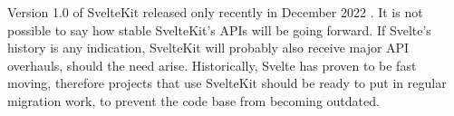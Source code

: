 Version 1.0 of SvelteKit released only recently in December 2022 \cite{team_announcing_2022}. It is not possible to say how stable SvelteKit's APIs will be going forward. If Svelte's history is any indication, SvelteKit will probably also receive major API overhauls, should the need arise. Historically, Svelte has proven to be fast moving, therefore projects that use SvelteKit should be ready to put in regular migration work, to prevent the code base from becoming outdated.

